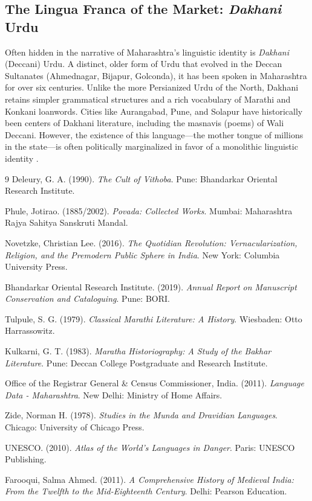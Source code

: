 \documentclass{article}
\begin{document}
\subsection{The Lingua Franca of the Market: \textit{Dakhani} Urdu}
Often hidden in the narrative of Maharashtra's linguistic identity is \textit{Dakhani} (Deccani) Urdu. A distinct, older form of Urdu that evolved in the Deccan Sultanates (Ahmednagar, Bijapur, Golconda), it has been spoken in Maharashtra for over six centuries. Unlike the more Persianized Urdu of the North, Dakhani retains simpler grammatical structures and a rich vocabulary of Marathi and Konkani loanwords. Cities like Aurangabad, Pune, and Solapur have historically been centers of Dakhani literature, including the masnavis (poems) of Wali Deccani. However, the existence of this language—the mother tongue of millions in the state—is often politically marginalized in favor of a monolithic linguistic identity \cite{farooqui}.

\begin{thebibliography}{9}
    Deleury, G. A. (1990). \textit{The Cult of Vithoba}. Pune: Bhandarkar Oriental Research Institute.

    Phule, Jotirao. (1885/2002). \textit{Povada: Collected Works}. Mumbai: Maharashtra Rajya Sahitya Sanskruti Mandal.

    Novetzke, Christian Lee. (2016). \textit{The Quotidian Revolution: Vernacularization, Religion, and the Premodern Public Sphere in India}. New York: Columbia University Press.

    Bhandarkar Oriental Research Institute. (2019). \textit{Annual Report on Manuscript Conservation and Cataloguing}. Pune: BORI.

    Tulpule, S. G. (1979). \textit{Classical Marathi Literature: A History}. Wiesbaden: Otto Harrassowitz.

    Kulkarni, G. T. (1983). \textit{Maratha Historiography: A Study of the Bakhar Literature}. Pune: Deccan College Postgraduate and Research Institute.

    Office of the Registrar General \& Census Commissioner, India. (2011). \textit{Language Data - Maharashtra}. New Delhi: Ministry of Home Affairs.

    Zide, Norman H. (1978). \textit{Studies in the Munda and Dravidian Languages}. Chicago: University of Chicago Press.

    UNESCO. (2010). \textit{Atlas of the World's Languages in Danger}. Paris: UNESCO Publishing.

    Farooqui, Salma Ahmed. (2011). \textit{A Comprehensive History of Medieval India: From the Twelfth to the Mid-Eighteenth Century}. Delhi: Pearson Education.

\end{thebibliography}
\end{document}

